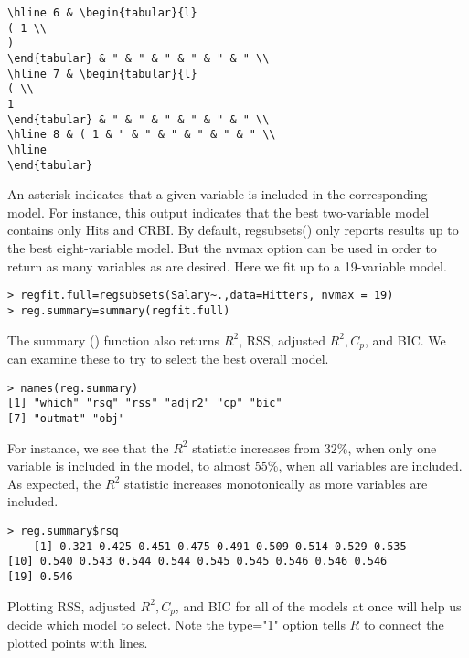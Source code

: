 \documentclass[10pt]{article}
\begin{document}
\begin{verbatim}
\hline 6 & \begin{tabular}{l}
( 1 \\
)
\end{tabular} & " & " & " & " & " & " \\
\hline 7 & \begin{tabular}{l}
( \\
1
\end{tabular} & " & " & " & " & " & " \\
\hline 8 & ( 1 & " & " & " & " & " & " \\
\hline
\end{tabular}
\end{verbatim}

An asterisk indicates that a given variable is included in the corresponding model. For instance, this output indicates that the best two-variable model contains only Hits and CRBI. By default, regsubsets() only reports results up to the best eight-variable model. But the nvmax option can be used in order to return as many variables as are desired. Here we fit up to a 19-variable model.

\begin{verbatim}
> regfit.full=regsubsets(Salary~.,data=Hitters, nvmax = 19)
> reg.summary=summary(regfit.full)
\end{verbatim}

The summary () function also returns $R^{2}$, RSS, adjusted $R^{2}, C_{p}$, and BIC. We can examine these to try to select the best overall model.

\begin{verbatim}
> names(reg.summary)
[1] "which" "rsq" "rss" "adjr2" "cp" "bic"
[7] "outmat" "obj"
\end{verbatim}

For instance, we see that the $R^{2}$ statistic increases from $32 \%$, when only one variable is included in the model, to almost $55 \%$, when all variables are included. As expected, the $R^{2}$ statistic increases monotonically as more variables are included.

\begin{verbatim}
> reg.summary$rsq
    [1] 0.321 0.425 0.451 0.475 0.491 0.509 0.514 0.529 0.535
[10] 0.540 0.543 0.544 0.544 0.545 0.545 0.546 0.546 0.546
[19] 0.546
\end{verbatim}

Plotting RSS, adjusted $R^{2}, C_{p}$, and BIC for all of the models at once will help us decide which model to select. Note the type="1" option tells $R$ to connect the plotted points with lines.
\end{document}
